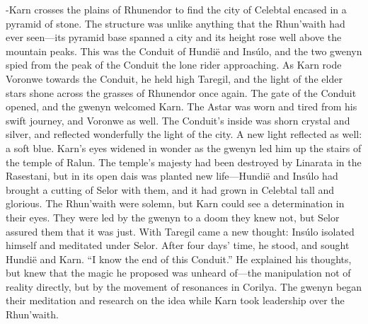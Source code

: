 \documentclass[smalldemyvopaper,11pt,twoside,onecolumn,openright,extrafontsizes]{memoir}
\begin{document}
{{-Karn crosses the plains of Rhunendor to find the city of Celebtal encased in a pyramid of stone. The structure was unlike anything that the Rhun’waith had ever seen—its pyramid base spanned a city and its height rose well above the mountain peaks. This was the Conduit of Hundië and Insúlo, and the two gwenyn spied from the peak of the Conduit the lone rider approaching. As Karn rode Voronwe towards the Conduit, he held high Taregil, and the light of the elder stars shone across the grasses of Rhunendor once again. The gate of the Conduit opened, and the gwenyn welcomed Karn. The Astar was worn and tired from his swift journey, and Voronwe as well. The Conduit’s inside was shorn crystal and silver, and reflected wonderfully the light of the city. A new light reflected as well: a soft blue. Karn’s eyes widened in wonder as the gwenyn led him up the stairs of the temple of Ralun. The temple’s majesty had been destroyed by Linarata in the Rasestani, but in its open dais was planted new life—Hundië and Insúlo had brought a cutting of Selor with them, and it had grown in Celebtal tall and glorious. The Rhun’waith were solemn, but Karn could see a determination in their eyes. They were led by the gwenyn to a doom they knew not, but Selor assured them that it was just.
	With Taregil came a new thought: Insúlo isolated himself and meditated under Selor. After four days’ time, he stood, and sought Hundië and Karn.
“I know the end of this Conduit.”
	He explained his thoughts, but knew that the magic he proposed was unheard of—the manipulation not of reality directly, but by the movement of resonances in Corilya. The gwenyn began their meditation and research on the idea while Karn took leadership over the Rhun’waith.

}}
\end{document}
